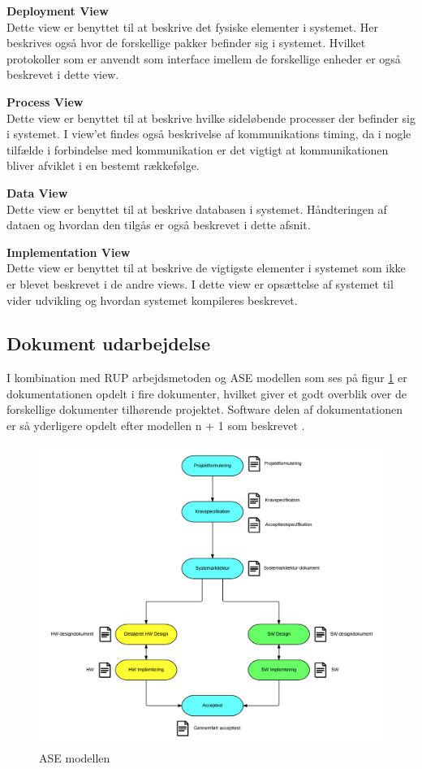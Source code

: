 \textbf{Deployment View}\\
Dette view er benyttet til at beskrive det fysiske elementer i systemet. Her beskrives også hvor de forskellige pakker befinder sig i systemet. Hvilket protokoller som er anvendt som interface imellem de forskellige enheder er også beskrevet i dette view.

\textbf{Process View}\\
Dette view er benyttet til at beskrive hvilke sideløbende processer der befinder sig i systemet. I view'et findes også beskrivelse af kommunikations timing, da i nogle tilfælde i forbindelse med kommunikation er det vigtigt at kommunikationen bliver afviklet i en bestemt rækkefølge.

\textbf{Data View}\\
Dette view er benyttet til at beskrive databasen i systemet. Håndteringen af dataen og hvordan den tilgås er også beskrevet i dette afsnit. 

\textbf{Implementation View}\\
Dette view er benyttet til at beskrive de vigtigste elementer i systemet som ikke er blevet beskrevet i de andre views. I dette view er opsættelse af systemet til vider udvikling og hvordan systemet kompileres beskrevet.

\subsection{Dokument udarbejdelse}
I kombination med RUP arbejdsmetoden og ASE modellen som ses på figur \ref{fig:dokument_udvikling} er dokumentationen opdelt i fire dokumenter, hvilket giver et godt overblik over de forskellige dokumenter tilhørende projektet. Software delen af dokumentationen er så yderligere opdelt efter modellen n + 1 som beskrevet .

\begin{figure}[H]
	\centering
	\includegraphics[width=1\textwidth]{Billeder/Udviklingsproces/ase_model}
	\caption{ASE modellen}
	\label{fig:dokument_udvikling}
\end{figure}

